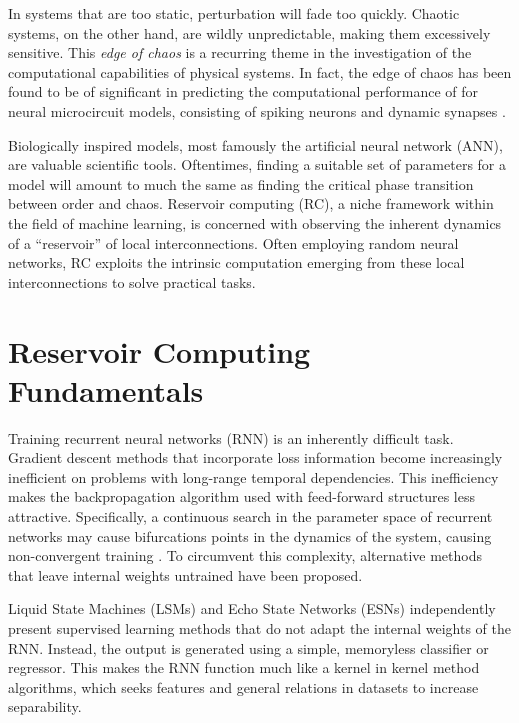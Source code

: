 In systems that are too static, perturbation will fade too quickly. Chaotic
systems, on the other hand, are wildly unpredictable, making them excessively
sensitive. This \textit{edge of chaos} is a recurring theme in the investigation
of the computational capabilities of physical systems. In fact, the edge of
chaos has been found to be of significant in predicting the computational
performance of for neural microcircuit models, consisting of spiking neurons and
dynamic synapses \cite{legenstein_edge_2007}.

Biologically inspired models, most famously the artificial neural network (ANN),
are valuable scientific tools. Oftentimes, finding a suitable set of parameters
for a model will amount to much the same as finding the critical phase
transition between order and chaos. Reservoir computing (RC), a niche framework
within the field of machine learning, is concerned with observing the inherent
dynamics of a ``reservoir'' of local interconnections. Often employing random
neural networks, RC exploits the intrinsic computation emerging from these local
interconnections to solve practical tasks.

\section{Reservoir Computing Fundamentals}


Training recurrent neural networks (RNN) is an inherently difficult
task. Gradient descent methods that incorporate loss information become
increasingly inefficient on problems with long-range temporal dependencies. This
inefficiency makes the backpropagation algorithm used with feed-forward
structures less attractive. Specifically, a continuous search in the parameter
space of recurrent networks may cause bifurcations points in the dynamics of the
system, causing non-convergent training \cite{doya_bifurcations_nodate}. To
circumvent this complexity, alternative methods that leave internal weights
untrained have been proposed.

Liquid State Machines (LSMs) \cite{maass_real-time_2002} and Echo State Networks
(ESNs) \cite{jaeger_echo_2001} independently present supervised learning methods
that do not adapt the internal weights of the RNN. Instead, the output is
generated using a simple, memoryless classifier or regressor. This makes the RNN
function much like a kernel in kernel method algorithms, which seeks features
and general relations in datasets to increase separability.


